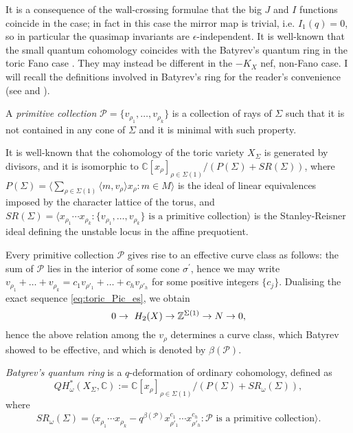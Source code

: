 It is a consequence of the wall-crossing formulae that the big $J$ and $I$ functions coincide in the  case; in fact in this case the mirror map is trivial, i.e. $I_1(q)=0$, so in particular the quasimap invariants are $\epsilon$-independent. It is well-known that the small quantum cohomology coincides with the Batyrev's quantum ring in the toric Fano case \cite[Example 11.2.5.2]{MS}. They may instead be different in the $-K_X$ nef, non-Fano case. I will recall the definitions involved in Batyrev's ring for the reader's convenience (see \cite{Batyrev} and \cite[Example 8.1.2.2]{MS}).
\begin{definition}
 A \emph{primitive collection} $\mathcal P=\{v_{\rho_1},\ldots,v_{\rho_k}\}$ is a collection of rays of $\Sigma$ such that it is not contained in any cone of $\Sigma$ and it is minimal with such property.
 
 It is well-known that the cohomology of the toric variety $X_\Sigma$ is generated by divisors, and it is isomorphic to $\mathbb C[x_\rho]_{\rho\in\Sigma(1)}/(P(\Sigma)+SR(\Sigma))$, where $P(\Sigma)=\langle \sum_{\rho\in\Sigma(1)}\langle m,v_\rho\rangle x_\rho : m\in M\rangle$ is the ideal of linear equivalences imposed by the character lattice of the torus, and $SR(\Sigma)=\langle x_{\rho_1}\cdots x_{\rho_k} : \{v_{\rho_1},\ldots,v_{\rho_k}\} \text{ is a primitive collection}\rangle$ is the Stanley-Reisner ideal defining the unstable locus in the affine prequotient.
 
 Every primitive collection $\mathcal P$ gives rise to an effective curve class as follows: the sum of $\mathcal P$ lies in the interior of some cone $\sigma^\prime$, hence we may write $v_{\rho_1}+\ldots+v_{\rho_k}=c_{1}v_{\rho'_1}+\ldots+c_{h}v_{\rho'_h}$ for some positive integers $\{c_j\}$. Dualising the exact sequence \eqref{eq:toric_Pic_es}, we obtain \[0\rightarrow\ H_2(X)\rightarrow \mathbb{Z}^{\Sigma(1)}\rightarrow N\rightarrow 0,\] hence the above relation among the $v_\rho$ determines a curve class, which Batyrev showed to be effective, and which is denoted by $\beta(\mathcal P)$.
 
 \emph{Batyrev's quantum ring} is a $q$-deformation of ordinary cohomology, defined as \[Q\!H^*_\omega(X_\Sigma,\mathbb C):=\mathbb C[x_\rho]_{\rho\in\Sigma(1)}/(P(\Sigma)+SR_\omega(\Sigma)),\] where \[SR_\omega(\Sigma)=\langle x_{\rho_1}\cdots x_{\rho_k}-q^{\beta(\mathcal P)}x_{\rho'_1}^{c_1}\cdots x_{\rho'_h}^{c_h} : \mathcal P\text{ is a primitive collection}\rangle.\]
\end{definition}


